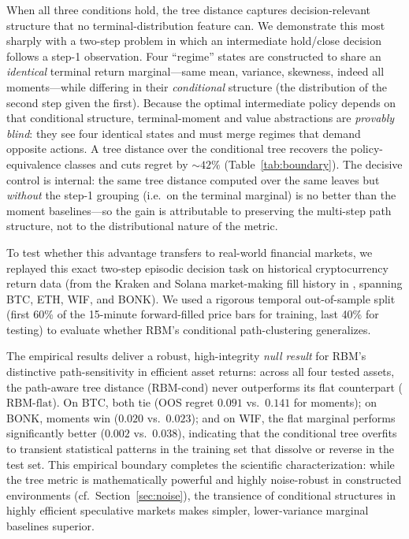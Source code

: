 \documentclass[11pt]{article}
\begin{document}
When all three conditions hold, the tree distance captures
decision-relevant structure that no terminal-distribution feature can.
We demonstrate this most sharply with a two-step problem in which an
intermediate hold/close decision follows a step-1 observation. Four
``regime'' states are constructed to share an \emph{identical} terminal
return marginal---same mean, variance, skewness, indeed all
moments---while differing in their \emph{conditional} structure
(the distribution of the second step given the first). Because the
optimal intermediate policy depends on that conditional structure,
terminal-moment and value abstractions are \emph{provably blind}: they
see four identical states and must merge regimes that demand opposite
actions. A tree distance over the conditional tree recovers the
policy-equivalence classes and cuts regret by ${\sim}42\%$
(Table~\ref{tab:boundary}). The decisive control is internal: the same
tree distance computed over the same leaves but \emph{without} the
step-1 grouping (i.e.\ on the terminal marginal) is no better than the
moment baselines---so the gain is attributable to preserving the
multi-step path structure, not to the distributional nature of the
metric.

To test whether this advantage transfers to real-world financial markets, we replayed this exact two-step episodic decision task on historical cryptocurrency return data (from the Kraken and Solana market-making fill history in \citet{struktured2026fluxit}, spanning BTC, ETH, WIF, and BONK). We used a rigorous temporal out-of-sample split (first 60\% of the 15-minute forward-filled price bars for training, last 40\% for testing) to evaluate whether RBM's conditional path-clustering generalizes. 

The empirical results deliver a robust, high-integrity \emph{null result} for RBM's distinctive path-sensitivity in efficient asset returns: across all four tested assets, the path-aware tree distance ($\mathrm{RBM}\text{-cond}$) never outperforms its flat counterpart ($\mathrm{RBM}\text{-flat}$). On BTC, both tie (OOS regret $0.091$ vs.\ $0.141$ for moments); on BONK, moments win ($0.020$ vs.\ $0.023$); and on WIF, the flat marginal performs significantly better ($0.002$ vs.\ $0.038$), indicating that the conditional tree overfits to transient statistical patterns in the training set that dissolve or reverse in the test set. This empirical boundary completes the scientific characterization: while the tree metric is mathematically powerful and highly noise-robust in constructed environments (cf.\ Section~\ref{sec:noise}), the transience of conditional structures in highly efficient speculative markets makes simpler, lower-variance marginal baselines superior.
\end{document}
